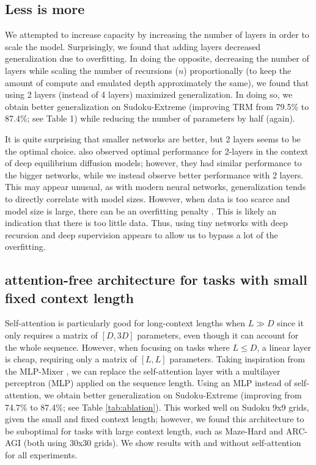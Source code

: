 \documentclass{article}
\theoremstyle{plain}
\theoremstyle{definition}
\theoremstyle{remark}
\begin{document}
\subsection{Less is more}

We attempted to increase capacity by increasing the number of layers in order to scale the model. Surprisingly, we found that adding layers decreased generalization due to overfitting. In doing the opposite, decreasing the number of layers while scaling the number of recursions ($n$) proportionally (to keep the amount of compute and emulated depth approximately the same), we found that using 2 layers (instead of 4 layers) maximized generalization. In doing so, we obtain better generalization on Sudoku-Extreme (improving TRM from 79.5\% to 87.4\%; see Table 1) while reducing the number of parameters by half (again).

It is quite surprising that smaller networks are better, but 2 layers seems to be the optimal choice. \citet{bai2024fixed} also observed optimal performance for 2-layers in the context of deep equilibrium diffusion models; however, they had similar performance to the bigger networks, while we instead observe better performance with 2 layers. This may appear unusual, as with modern neural networks, generalization tends to directly correlate with model sizes. However, when data is too scarce and model size is large, there can be an overfitting penalty \citep{kaplan2020scaling}. This is likely an indication that there is too little data. Thus, using tiny networks with deep recursion and deep supervision appears to allow us to bypass a lot of the overfitting. 

\subsection{attention-free architecture for tasks with small fixed context length}

Self-attention is particularly good for long-context lengths when $L \gg D$ since it only requires a matrix of $[D,3D]$ parameters, even though it can account for the whole sequence. However, when focusing on tasks where $L \leq D$, a linear layer is cheap, requiring only a matrix of $[L,L]$ parameters. Taking inspiration from the MLP-Mixer \citep{tolstikhin2021mlp}, we can replace the self-attention layer with a multilayer perceptron (MLP) applied on the sequence length. Using an MLP instead of self-attention, we obtain better generalization on Sudoku-Extreme (improving from 74.7\% to 87.4\%; see Table \ref{tab:ablation}). This worked well on Sudoku 9x9 grids, given the small and fixed context length; however, we found this architecture to be suboptimal for tasks with large context length, such as Maze-Hard and ARC-AGI (both using 30x30 grids). We show results with and without self-attention for all experiments.
\end{document}

